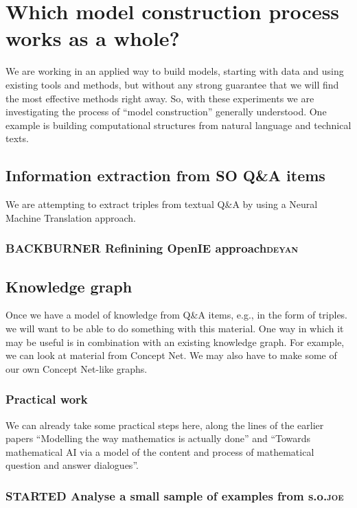 \documentclass[11pt]{article}
\begin{document}
\section{Which model construction process works as a whole?}
\label{sec:orga55ebcb}
We are working in an applied way to build models, starting with data
and using existing tools and methods, but without any strong guarantee
that we will find the most effective methods right away. So, with
these experiments we are investigating the process of “model
construction” generally understood. One example is building
computational structures from natural language and technical texts.

\subsection{Information extraction from SO Q\&A items}
\label{sec:orgdad46c6}
We are attempting to extract triples from textual Q\&A by using a
Neural Machine Translation approach.

\subsubsection{{\bfseries\sffamily BACKBURNER} Refinining OpenIE approach\hfill{}\textsc{deyan}}
\label{sec:orgd55e6b4}
\subsection{Knowledge graph}
\label{sec:orgb8d9f87}
Once we have a model of knowledge from Q\&A items, e.g., in the form of
triples. we will want to be able to do something with this material.
One way in which it may be useful is in combination with an existing
knowledge graph.  For example, we can look at material from Concept
Net.  We may also have to make some of our own Concept Net-like
graphs.

\subsubsection{Practical work}
\label{sec:orge0cad30}

We can already take some practical steps here, along the lines of the
earlier papers ``Modelling the way mathematics is actually done'' and
``Towards mathematical AI via a model of the content and process of
mathematical question and answer dialogues''.

\subsubsection{{\bfseries\sffamily STARTED} Analyse a small sample of examples from s.o.\hfill{}\textsc{joe}}
\label{sec:org1583338}
\end{document}
